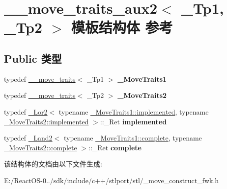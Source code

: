\hypertarget{struct____move__traits__aux2}{}\section{\+\_\+\+\_\+move\+\_\+traits\+\_\+aux2$<$ \+\_\+\+Tp1, \+\_\+\+Tp2 $>$ 模板结构体 参考}
\label{struct____move__traits__aux2}
\subsection*{Public 类型}
\begin{DoxyCompactItemize}
\item 
\mbox{\label{struct____move__traits__aux2_a12ec78e38cc75f481bc1b0f8cf9a060b}} 
typedef \hyperlink{struct____move__traits}{\+\_\+\+\_\+move\+\_\+traits}$<$ \+\_\+\+Tp1 $>$ {\bfseries \+\_\+\+Move\+Traits1}
\item 
\mbox{\label{struct____move__traits__aux2_abf6751f700799ace9c5a732f24998024}} 
typedef \hyperlink{struct____move__traits}{\+\_\+\+\_\+move\+\_\+traits}$<$ \+\_\+\+Tp2 $>$ {\bfseries \+\_\+\+Move\+Traits2}
\item 
\mbox{\label{struct____move__traits__aux2_aafc19d947a79e83f87d971d65bc6fdaa}} 
typedef \hyperlink{struct___lor2}{\+\_\+\+Lor2}$<$ typename \hyperlink{struct____false__type}{\+\_\+\+Move\+Traits1\+::implemented}, typename \hyperlink{struct____false__type}{\+\_\+\+Move\+Traits2\+::implemented} $>$\+::\+\_\+\+Ret {\bfseries implemented}
\item 
\mbox{\label{struct____move__traits__aux2_a962009e3c911eabb144829b6f3d74357}} 
typedef \hyperlink{struct___land2}{\+\_\+\+Land2}$<$ typename \hyperlink{struct____true__type}{\+\_\+\+Move\+Traits1\+::complete}, typename \hyperlink{struct____true__type}{\+\_\+\+Move\+Traits2\+::complete} $>$\+::\+\_\+\+Ret {\bfseries complete}
\end{DoxyCompactItemize}


该结构体的文档由以下文件生成\+:\begin{DoxyCompactItemize}
\item 
E\+:/\+React\+O\+S-\/0../sdk/include/c++/stlport/stl/\+\_\+move\+\_\+construct\+\_\+fwk.\+h\end{DoxyCompactItemize}
